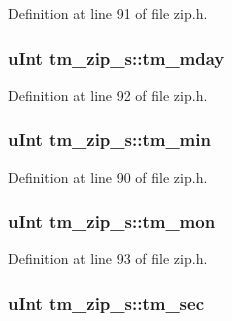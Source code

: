 Definition at line 91 of file zip.\+h.

\hypertarget{structtm__zip__s_aebc461dd0a4a7b7ebd4e00de5fbf594d}{
\subsubsection[{tm\+\_\+mday}]{\setlength{\rightskip}{0pt plus 5cm}u\+Int tm\+\_\+zip\+\_\+s\+::tm\+\_\+mday}}\label{structtm__zip__s_aebc461dd0a4a7b7ebd4e00de5fbf594d}


Definition at line 92 of file zip.\+h.

\hypertarget{structtm__zip__s_ad539676c1522e9f2cb77cb9e65795e2a}{
\subsubsection[{tm\+\_\+min}]{\setlength{\rightskip}{0pt plus 5cm}u\+Int tm\+\_\+zip\+\_\+s\+::tm\+\_\+min}}\label{structtm__zip__s_ad539676c1522e9f2cb77cb9e65795e2a}


Definition at line 90 of file zip.\+h.

\hypertarget{structtm__zip__s_ae98d11f7e2b2330b3a83efe97ffef574}{
\subsubsection[{tm\+\_\+mon}]{\setlength{\rightskip}{0pt plus 5cm}u\+Int tm\+\_\+zip\+\_\+s\+::tm\+\_\+mon}}\label{structtm__zip__s_ae98d11f7e2b2330b3a83efe97ffef574}


Definition at line 93 of file zip.\+h.

\hypertarget{structtm__zip__s_adf073cb37484b209d7f7f0e23275a52d}{
\subsubsection[{tm\+\_\+sec}]{\setlength{\rightskip}{0pt plus 5cm}u\+Int tm\+\_\+zip\+\_\+s\+::tm\+\_\+sec}}\label{structtm__zip__s_adf073cb37484b209d7f7f0e23275a52d}



